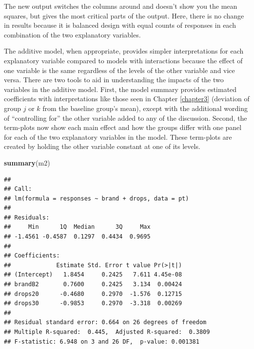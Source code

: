 \documentclass[]{book}
\newenvironment{Shaded}{\begin{snugshade}}{\end{snugshade}}
\newcommand{\KeywordTok}[1]{\textcolor[rgb]{0.13,0.29,0.53}{\textbf{#1}}}
\newcommand{\NormalTok}[1]{#1}
\theoremstyle{definition}
\theoremstyle{definition}
\theoremstyle{remark}
\begin{document}
The new output switches the columns around and doesn't show you the mean
squares, but gives the most critical parts of the output. Here, there is
no change in results because it is balanced design with equal counts of
responses in each combination of the two explanatory variables.

The additive model, when appropriate, provides simpler interpretations
for each explanatory variable compared to models with interactions
because the effect of one variable is the same regardless of the levels
of the other variable and vice versa. There are two tools to aid in
understanding the impacts of the two variables in the additive model.
First, the model summary provides estimated coefficients with
interpretations like those seen in Chapter \ref{chapter3} (deviation of
group \(j\) or \(k\) from the baseline group's mean), except with the
additional wording of ``controlling for'' the other variable added to
any of the discussion. Second, the term-plots now show each main effect
and how the groups differ with one panel for each of the two explanatory
variables in the model. These term-plots are created by holding the
other variable constant at one of its levels.

\begin{Shaded}
\begin{Highlighting}[]
\KeywordTok{summary}\NormalTok{(m2)}
\end{Highlighting}
\end{Shaded}

\begin{verbatim}
## 
## Call:
## lm(formula = responses ~ brand + drops, data = pt)
## 
## Residuals:
##     Min      1Q  Median      3Q     Max 
## -1.4561 -0.4587  0.1297  0.4434  0.9695 
## 
## Coefficients:
##             Estimate Std. Error t value Pr(>|t|)
## (Intercept)   1.8454     0.2425   7.611 4.45e-08
## brandB2       0.7600     0.2425   3.134  0.00424
## drops20      -0.4680     0.2970  -1.576  0.12715
## drops30      -0.9853     0.2970  -3.318  0.00269
## 
## Residual standard error: 0.664 on 26 degrees of freedom
## Multiple R-squared:  0.445,  Adjusted R-squared:  0.3809 
## F-statistic: 6.948 on 3 and 26 DF,  p-value: 0.001381
\end{verbatim}
\end{document}
